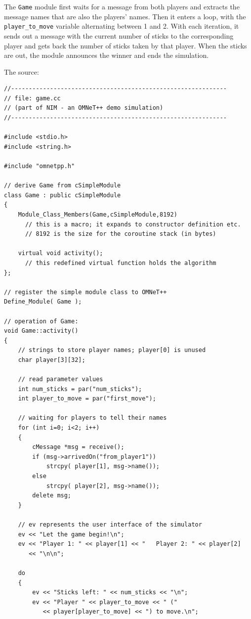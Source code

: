 The \texttt{Game} module first waits for a message from both players
and extracts the message names that are also the players' names.  Then
it enters a loop, with the \texttt{player\_to\_move} variable
alternating between 1 and 2. With each iteration, it sends out a
message with the current number of sticks to the corresponding player
and gets back the number of sticks taken by that player. When the
sticks are out, the module announces the winner and ends the
simulation.

The source:


\begin{Verbatim}
//-------------------------------------------------------------
// file: game.cc
// (part of NIM - an OMNeT++ demo simulation)
//-------------------------------------------------------------

#include <stdio.h>
#include <string.h>

#include "omnetpp.h"

// derive Game from cSimpleModule
class Game : public cSimpleModule
{
    Module_Class_Members(Game,cSimpleModule,8192)
      // this is a macro; it expands to constructor definition etc. 
      // 8192 is the size for the coroutine stack (in bytes)

    virtual void activity();
      // this redefined virtual function holds the algorithm
};

// register the simple module class to OMNeT++
Define_Module( Game );

// operation of Game:
void Game::activity()
{
    // strings to store player names; player[0] is unused
    char player[3][32];

    // read parameter values
    int num_sticks = par("num_sticks");
    int player_to_move = par("first_move");

    // waiting for players to tell their names
    for (int i=0; i<2; i++)
    {
        cMessage *msg = receive();
        if (msg->arrivedOn("from_player1"))
            strcpy( player[1], msg->name());
        else
            strcpy( player[2], msg->name());
        delete msg;
    }

    // ev represents the user interface of the simulator
    ev << "Let the game begin!\n";
    ev << "Player 1: " << player[1] << "   Player 2: " << player[2]
       << "\n\n";

    do
    {
        ev << "Sticks left: " << num_sticks << "\n";
        ev << "Player " << player_to_move << " ("
           << player[player_to_move] << ") to move.\n"; 


\end{Verbatim}

